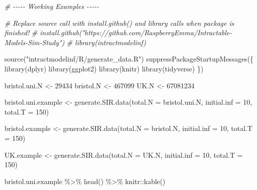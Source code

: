 \documentclass[
]{article}
\newenvironment{Shaded}{\begin{snugshade}}{\end{snugshade}}
\newcommand{\AttributeTok}[1]{\textcolor[rgb]{0.77,0.63,0.00}{#1}}
\newcommand{\CommentTok}[1]{\textcolor[rgb]{0.56,0.35,0.01}{\textit{#1}}}
\newcommand{\DecValTok}[1]{\textcolor[rgb]{0.00,0.00,0.81}{#1}}
\newcommand{\FunctionTok}[1]{\textcolor[rgb]{0.00,0.00,0.00}{#1}}
\newcommand{\NormalTok}[1]{#1}
\newcommand{\OtherTok}[1]{\textcolor[rgb]{0.56,0.35,0.01}{#1}}
\newcommand{\SpecialCharTok}[1]{\textcolor[rgb]{0.00,0.00,0.00}{#1}}
\newcommand{\StringTok}[1]{\textcolor[rgb]{0.31,0.60,0.02}{#1}}
\begin{document}
\begin{Shaded}
\begin{Highlighting}[]
\CommentTok{\# {-}{-}{-}{-}{-} Working Examples {-}{-}{-}{-}{-}}

\CommentTok{\# Replace source call with install.github() and library calls when package is finished!}
\CommentTok{\# install.github("https://github.com/RaspberryEmma/Intractable{-}Models{-}Sim{-}Study")}
\CommentTok{\# library(intractmodelinf)}

\FunctionTok{source}\NormalTok{(}\StringTok{"intractmodelinf/R/generate\_data.R"}\NormalTok{)}
\FunctionTok{suppressPackageStartupMessages}\NormalTok{(\{}
  \FunctionTok{library}\NormalTok{(dplyr)}
  \FunctionTok{library}\NormalTok{(ggplot2)}
  \FunctionTok{library}\NormalTok{(knitr)}
  \FunctionTok{library}\NormalTok{(tidyverse)}
\NormalTok{\})}

\NormalTok{bristol.uni.N }\OtherTok{\textless{}{-}} \DecValTok{29434}
\NormalTok{bristol.N     }\OtherTok{\textless{}{-}} \DecValTok{467099}
\NormalTok{UK.N          }\OtherTok{\textless{}{-}} \DecValTok{67081234}

\NormalTok{bristol.uni.example }\OtherTok{\textless{}{-}} \FunctionTok{generate.SIR.data}\NormalTok{(}\AttributeTok{total.N     =}\NormalTok{ bristol.uni.N,}
                                         \AttributeTok{initial.inf =} \DecValTok{10}\NormalTok{,}
                                         \AttributeTok{total.T     =} \DecValTok{150}\NormalTok{)}

\NormalTok{bristol.example }\OtherTok{\textless{}{-}} \FunctionTok{generate.SIR.data}\NormalTok{(}\AttributeTok{total.N     =}\NormalTok{ bristol.N,}
                                     \AttributeTok{initial.inf =} \DecValTok{10}\NormalTok{,}
                                     \AttributeTok{total.T     =} \DecValTok{150}\NormalTok{)}

\NormalTok{UK.example }\OtherTok{\textless{}{-}} \FunctionTok{generate.SIR.data}\NormalTok{(}\AttributeTok{total.N     =}\NormalTok{ UK.N,}
                                \AttributeTok{initial.inf =} \DecValTok{10}\NormalTok{,}
                                \AttributeTok{total.T     =} \DecValTok{150}\NormalTok{)}

\NormalTok{bristol.uni.example }\SpecialCharTok{\%\textgreater{}\%} \FunctionTok{head}\NormalTok{() }\SpecialCharTok{\%\textgreater{}\%}\NormalTok{ knitr}\SpecialCharTok{::}\FunctionTok{kable}\NormalTok{()}
\end{Highlighting}
\end{Shaded}
\end{document}

